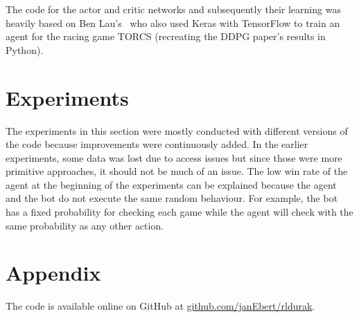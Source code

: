 \documentclass[a4paper,titlepage]{article}
\begin{document}
The code for the actor and critic networks and subsequently their learning was heavily based on Ben Lau's~\cite{torcs} who also used Keras with TensorFlow to train an agent for the racing game TORCS (recreating the DDPG paper's results in Python).

\newpage

\section{Experiments}

The experiments in this section were mostly conducted with different versions of the code because improvements were continuously added. In the earlier experiments, some data was lost due to access issues but since those were more primitive approaches, it should not be much of an issue.
The low win rate of the agent at the beginning of the experiments can be explained because the agent and the bot do not execute the same random behaviour. For example, the bot has a fixed probability for checking each game while the agent will check with the same probability as any other action.

\newpage

\section{Appendix}
\label{sec:appendix}

The code is available online on GitHub at \url{github.com/janEbert/rldurak}.

\newpage
\end{document}
